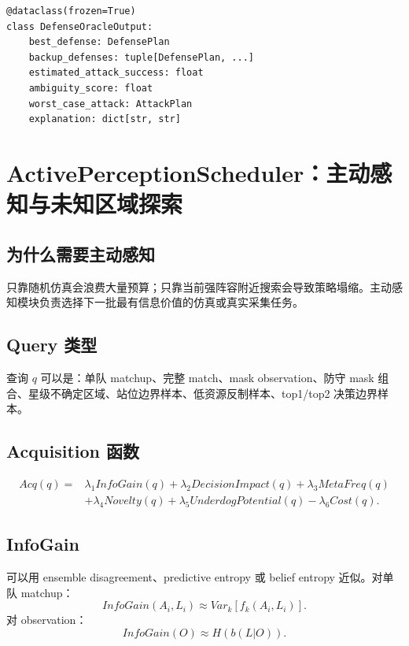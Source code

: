 \documentclass[UTF8,12pt,openany]{ctexbook}
\begin{document}
\begin{lstlisting}[caption={DefenseOracle 输出结构}]
@dataclass(frozen=True)
class DefenseOracleOutput:
    best_defense: DefensePlan
    backup_defenses: tuple[DefensePlan, ...]
    estimated_attack_success: float
    ambiguity_score: float
    worst_case_attack: AttackPlan
    explanation: dict[str, str]
\end{lstlisting}


\chapter{ActivePerceptionScheduler：主动感知与未知区域探索}

\section{为什么需要主动感知}
只靠随机仿真会浪费大量预算；只靠当前强阵容附近搜索会导致策略塌缩。主动感知模块负责选择下一批最有信息价值的仿真或真实采集任务。

\section{Query 类型}
查询 $q$ 可以是：单队 matchup、完整 match、mask observation、防守 mask 组合、星级不确定区域、站位边界样本、低资源反制样本、top1/top2 决策边界样本。

\section{Acquisition 函数}
\begin{equation}
\begin{aligned}
Acq(q)=&\lambda_1InfoGain(q)+\lambda_2DecisionImpact(q)+\lambda_3MetaFreq(q)\\
&+\lambda_4Novelty(q)+\lambda_5UnderdogPotential(q)-\lambda_6Cost(q).
\end{aligned}
\end{equation}

\section{InfoGain}
可以用 ensemble disagreement、predictive entropy 或 belief entropy 近似。对单队 matchup：
\begin{equation}
InfoGain(A_i,L_i)\approx Var_k[f_k(A_i,L_i)].
\end{equation}
对 observation：
\begin{equation}
InfoGain(O)\approx H(b(L|O)).
\end{equation}
\end{document}
